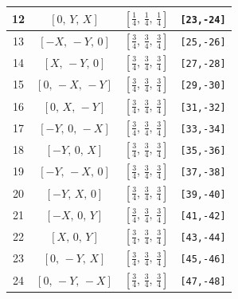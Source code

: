 \documentclass[fleqn,8pt]{jsarticle}
\begin{document}
\begin{longtable}{cccc}
12 & $\left[ 0,\, Y,\, X \right]$ & $\left[ \frac{1}{4},\, \frac{1}{4},\, \frac{1}{4} \right]$ & {\tt [23,-24]} \\ \hline
13 & $\left[ - X,\, - Y,\, 0 \right]$ & $\left[ \frac{3}{4},\, \frac{3}{4},\, \frac{3}{4} \right]$ & {\tt [25,-26]} \\ \hline
14 & $\left[ X,\, - Y,\, 0 \right]$ & $\left[ \frac{3}{4},\, \frac{3}{4},\, \frac{3}{4} \right]$ & {\tt [27,-28]} \\ \hline
15 & $\left[ 0,\, - X,\, - Y \right]$ & $\left[ \frac{3}{4},\, \frac{3}{4},\, \frac{3}{4} \right]$ & {\tt [29,-30]} \\ \hline
16 & $\left[ 0,\, X,\, - Y \right]$ & $\left[ \frac{3}{4},\, \frac{3}{4},\, \frac{3}{4} \right]$ & {\tt [31,-32]} \\ \hline
17 & $\left[ - Y,\, 0,\, - X \right]$ & $\left[ \frac{3}{4},\, \frac{3}{4},\, \frac{3}{4} \right]$ & {\tt [33,-34]} \\ \hline
18 & $\left[ - Y,\, 0,\, X \right]$ & $\left[ \frac{3}{4},\, \frac{3}{4},\, \frac{3}{4} \right]$ & {\tt [35,-36]} \\ \hline
19 & $\left[ - Y,\, - X,\, 0 \right]$ & $\left[ \frac{3}{4},\, \frac{3}{4},\, \frac{3}{4} \right]$ & {\tt [37,-38]} \\ \hline
20 & $\left[ - Y,\, X,\, 0 \right]$ & $\left[ \frac{3}{4},\, \frac{3}{4},\, \frac{3}{4} \right]$ & {\tt [39,-40]} \\ \hline
21 & $\left[ - X,\, 0,\, Y \right]$ & $\left[ \frac{3}{4},\, \frac{3}{4},\, \frac{3}{4} \right]$ & {\tt [41,-42]} \\ \hline
22 & $\left[ X,\, 0,\, Y \right]$ & $\left[ \frac{3}{4},\, \frac{3}{4},\, \frac{3}{4} \right]$ & {\tt [43,-44]} \\ \hline
23 & $\left[ 0,\, - Y,\, X \right]$ & $\left[ \frac{3}{4},\, \frac{3}{4},\, \frac{3}{4} \right]$ & {\tt [45,-46]} \\ \hline
24 & $\left[ 0,\, - Y,\, - X \right]$ & $\left[ \frac{3}{4},\, \frac{3}{4},\, \frac{3}{4} \right]$ & {\tt [47,-48]} \\
\end{longtable}
\renewcommand{\arraystretch}{1.2}
\end{document}

